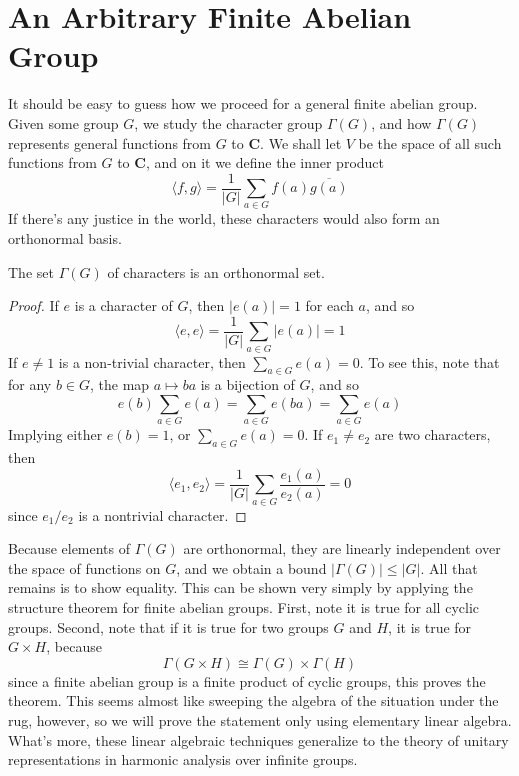 \section{An Arbitrary Finite Abelian Group}

It should be easy to guess how we proceed for a general finite abelian group. Given some group $G$, we study the character group $\Gamma(G)$, and how $\Gamma(G)$ represents general functions from $G$ to $\mathbf{C}$. We shall let $V$ be the space of all such functions from $G$ to $\mathbf{C}$, and on it we define the inner product
%
\[ \langle f, g \rangle = \frac{1}{|G|} \sum_{a \in G} f(a) \overline{g(a)} \]
%
If there's any justice in the world, these characters would also form an orthonormal basis.

\begin{theorem}
    The set $\Gamma(G)$ of characters is an orthonormal set.
\end{theorem}
\begin{proof}
    If $e$ is a character of $G$, then $|e(a)| = 1$ for each $a$, and so
    \[ \langle e, e \rangle = \frac{1}{|G|} \sum_{a \in G} |e(a)| = 1 \]
    If $e \neq 1$ is a non-trivial character, then $\sum_{a \in G} e(a) = 0$. To see this, note that for any $b \in G$, the map $a \mapsto ba$ is a bijection of $G$, and so
    \[ e(b) \sum_{a \in G} e(a) = \sum_{a \in G} e(ba) = \sum_{a \in G} e(a) \]
    Implying either $e(b) = 1$, or $\sum_{a \in G} e(a) = 0$. If $e_1 \neq e_2$ are two characters, then
    \[ \langle e_1, e_2 \rangle = \frac{1}{|G|} \sum_{a \in G} \frac{e_1(a)}{e_2(a)} = 0 \]
    since $e_1/e_2$ is a nontrivial character.
\end{proof}

Because elements of $\Gamma(G)$ are orthonormal, they are linearly independent over the space of functions on $G$, and we obtain a bound $|\Gamma(G)| \leq |G|$. All that remains is to show equality. This can be shown very simply by applying the structure theorem for finite abelian groups. First, note it is true for all cyclic groups. Second, note that if it is true for two groups $G$ and $H$, it is true for $G \times H$, because
%
\[ \Gamma(G \times H) \cong \Gamma(G) \times \Gamma(H) \]
%
since a finite abelian group is a finite product of cyclic groups, this proves the theorem. This seems almost like sweeping the algebra of the situation under the rug, however, so we will prove the statement only using elementary linear algebra. What's more, these linear algebraic techniques generalize to the theory of unitary representations in harmonic analysis over infinite groups.

